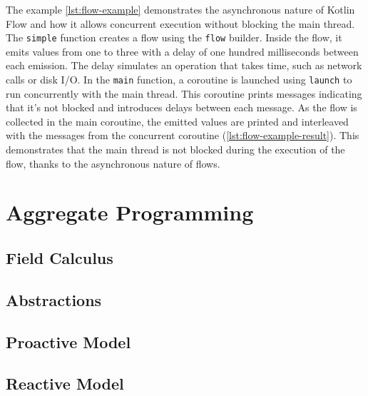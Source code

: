 \documentclass[12pt,a4paper,openright,twoside]{book}
\begin{document}
The example \cref{lst:flow-example} demonstrates the asynchronous nature of Kotlin Flow and how it allows concurrent execution without blocking the main thread. The \texttt{simple} function creates a flow using the \texttt{flow} builder. Inside the flow, it emits values from one to three with a delay of one hundred milliseconds between each emission. The delay simulates an operation that takes time, such as network calls or disk I/O. In the \texttt{main} function, a coroutine is launched using \texttt{launch} to run concurrently with the main thread. This coroutine prints messages indicating that it's not blocked and introduces delays between each message. As the flow is collected in the main coroutine, the emitted values are printed and interleaved with the messages from the concurrent coroutine (\cref{lst:flow-example-result}). This demonstrates that the main thread is not blocked during the execution of the flow, thanks to the asynchronous nature of flows.





\section{Aggregate Programming}

\subsection{Field Calculus}

\subsection{Abstractions}


\subsection{Proactive Model}


\subsection{Reactive Model}
\end{document}
